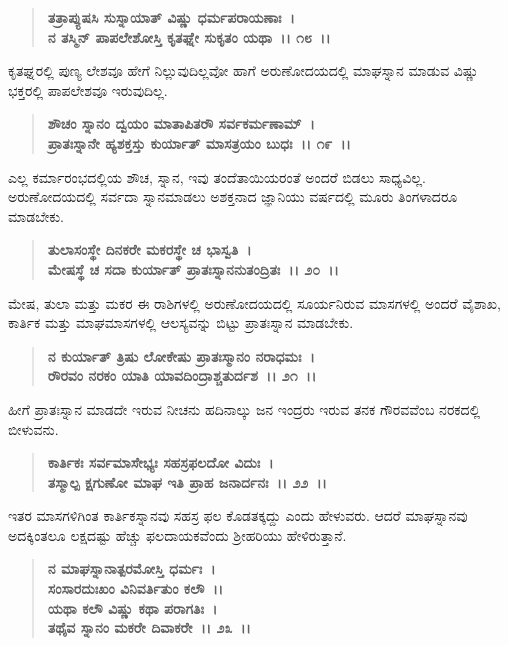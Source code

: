 \begin{verse}
\textbf{ತತ್ರಾಪ್ಯುಷಸಿ ಸುಸ್ನಾಯಾತ್ ವಿಷ್ಣು ಧರ್ಮಪರಾಯಣಾಃ~।}\\\textbf{ನ ತಸ್ಮಿನ್ ಪಾಪಲೇಶೋಸ್ತಿ ಕೃತಘ್ನೇ ಸುಕೃತಂ ಯಥಾ~।। ೧೮~।।}
\end{verse}

ಕೃತಘ್ನರಲ್ಲಿ ಪುಣ್ಯ ಲೇಶವೂ ಹೇಗೆ ನಿಲ್ಲುವುದಿಲ್ಲವೋ ಹಾಗೆ ಅರುಣೋದಯದಲ್ಲಿ ಮಾಘಸ್ನಾನ ಮಾಡುವ ವಿಷ್ಣು ಭಕ್ತರಲ್ಲಿ ಪಾಪಲೇಶವೂ ಇರುವುದಿಲ್ಲ.

\begin{verse}
\textbf{ಶೌಚಂ ಸ್ನಾನಂ ದ್ವಯಂ ಮಾತಾಪಿತರೌ ಸರ್ವಕರ್ಮಣಾಮ್~।}\\\textbf{ಪ್ರಾತಃಸ್ನಾನೇ ಹ್ಯಶಕ್ತಸ್ತು ಕುರ್ಯಾತ್ ಮಾಸತ್ರಯಂ ಬುಧಃ~।। ೧೯~।।}
\end{verse}

ಎಲ್ಲ ಕರ್ಮಾರಂಭದಲ್ಲಿಯ ಶೌಚ, ಸ್ನಾನ, ಇವು ತಂದೆತಾಯಿಯರಂತೆ ಅಂದರೆ ಬಿಡಲು ಸಾಧ್ಯವಿಲ್ಲ. ಅರುಣೋದಯದಲ್ಲಿ ಸರ್ವದಾ ಸ್ನಾನಮಾಡಲು ಅಶಕ್ತನಾದ ಜ್ಞಾನಿಯು ವರ್ಷದಲ್ಲಿ ಮೂರು ತಿಂಗಳಾದರೂ ಮಾಡಬೇಕು.

\begin{verse}
\textbf{ತುಲಾಸಂಸ್ಥೇ ದಿನಕರೇ ಮಕರಸ್ಥೇ ಚ ಭಾಸ್ವತಿ~।}\\\textbf{ಮೇಷಸ್ಥೆ ಚ ಸದಾ ಕುರ್ಯಾತ್ ಪ್ರಾತಃಸ್ನಾನನುತಂದ್ರಿತಃ~।। ೨೦~।।}
\end{verse}

ಮೇಷ, ತುಲಾ ಮತ್ತು ಮಕರ ಈ ರಾಶಿಗಳಲ್ಲಿ ಅರುಣೋದಯದಲ್ಲಿ ಸೂರ್ಯನಿರುವ ಮಾಸಗಳಲ್ಲಿ ಅಂದರೆ ವೈಶಾಖ, ಕಾರ್ತಿಕ ಮತ್ತು ಮಾಘಮಾಸಗಳಲ್ಲಿ ಆಲಸ್ಯವನ್ನು ಬಿಟ್ಟು ಪ್ರಾತಃಸ್ನಾನ ಮಾಡಬೇಕು.

\begin{verse}
\textbf{ನ ಕುರ್ಯಾತ್ ತ್ರಿಷು ಲೋಕೇಷು ಪ್ರಾತಃಸ್ಮಾನಂ ನರಾಧಮಃ~।}\\\textbf{ರೌರವಂ ನರಕಂ ಯಾತಿ ಯಾವದಿಂದ್ರಾಶ್ಚತುರ್ದಶ~।। ೨೧~।।}
\end{verse}

ಹೀಗೆ ಪ್ರಾತಃಸ್ನಾನ ಮಾಡದೇ ಇರುವ ನೀಚನು ಹದಿನಾಲ್ಕು ಜನ ಇಂದ್ರರು ಇರುವ ತನಕ ಗೌರವವೆಂಬ ನರಕದಲ್ಲಿ ಬೀಳುವನು.

\begin{verse}
\textbf{ಕಾರ್ತಿಕಃ ಸರ್ವಮಾಸೇಭ್ಯಃ ಸಹಸ್ರಫಲದೋ ವಿದುಃ~।}\\\textbf{ತಸ್ಮಾಲ್ಪ ಕ್ಷಗುಣೋ ಮಾಘ ಇತಿ ಪ್ರಾಹ ಜನಾರ್ದನಃ~।। ೨೨~।।}
\end{verse}

ಇತರ ಮಾಸಗಳಿಗಿಂತ ಕಾರ್ತಿಕಸ್ನಾನವು ಸಹಸ್ರ ಫಲ ಕೊಡತಕ್ಕದ್ದು ಎಂದು ಹೇಳುವರು. ಆದರೆ ಮಾಘಸ್ನಾನವು ಅದಕ್ಕಿಂತಲೂ ಲಕ್ಷದಷ್ಟು ಹೆಚ್ಚು ಫಲದಾಯಕವೆಂದು ಶ‍್ರೀಹರಿಯು ಹೇಳಿರುತ್ತಾನೆ.

\begin{verse}
\textbf{ನ ಮಾಘಸ್ನಾನಾತ್ಪರಮೋಸ್ತಿ ಧರ್ಮಃ~।}\\\textbf{ಸಂಸಾರದುಃಖಂ ವಿನಿವರ್ತಿತುಂ ಕಲೌ~।।}\\\textbf{ಯಥಾ ಕಲೌ ವಿಷ್ಣು ಕಥಾ ಪರಾಗತಿಃ~।}\\\textbf{ತಥೈವ ಸ್ನಾನಂ ಮಕರೇ ದಿವಾಕರೇ~।। ೨೩~।।}
\end{verse}


